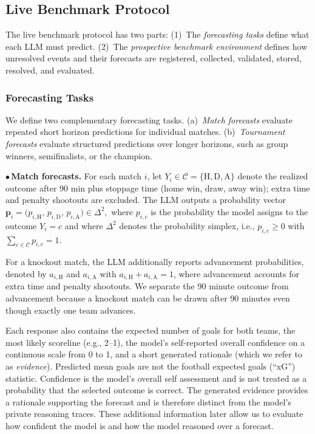 \documentclass[sigconf,nonacm]{acmart}
\begin{document}
\subsection{Live Benchmark Protocol}
\label{sec:live-protocol}
The live benchmark protocol has two parts: (1)~The \emph{forecasting tasks} define what each LLM must predict. (2)~The \emph{prospective benchmark environment} defines how unresolved events and their forecasts are registered, collected, validated, stored, resolved, and evaluated.

\subsubsection{Forecasting Tasks}
\label{sec:forecasting-tasks}

We define two complementary forecasting tasks. (a)~\emph{Match forecasts} evaluate repeated short horizon predictions for individual matches. (b)~\emph{Tournament forecasts} evaluate structured predictions over longer horizons, such as group winners, semifinalists, or the champion.

\textbf{$\bullet$\,Match forecasts.}
For each match $i$, let $Y_i \in \mathcal{C} = \{\mathrm{H},\mathrm{D},\mathrm{A}\}$ denote the realized outcome after 90 min plus stoppage time (home win, draw, away win); extra time and penalty shootouts are excluded. The LLM outputs a probability vector
$\mathbf{p}_i = \bigl(p_{i,\mathrm{H}},\, p_{i,\mathrm{D}},\, p_{i,\mathrm{A}}\bigr) \in \Delta^{2},$
where $p_{i,c}$ is the probability the model assigns to the outcome $Y_i = c$ and where $\Delta^{2}$ denotes the probability simplex, i.e., $p_{i,c} \geq 0$ with $\sum_{c \in \mathcal{C}} p_{i,c} = 1$.

For a knockout match, the LLM additionally reports advancement probabilities, denoted by $a_{i,\mathrm{H}}$ and $a_{i,\mathrm{A}}$ with $a_{i,\mathrm{H}} + a_{i,\mathrm{A}} = 1$, where advancement accounts for extra time and penalty shootouts. We separate the 90 minute outcome from advancement because a knockout match can be drawn after 90 minutes even though exactly one team advances.

Each response also contains the expected number of goals for both teams, the most likely scoreline (e.g., 2–1), the model’s self-reported overall confidence on a continuous scale from 0 to 1, and a short generated rationale (which we refer to as \emph{evidence}). Predicted mean goals are not the football expected goals (``xG'') statistic. Confidence is the model's overall self assessment and is not treated as a probability that the selected outcome is correct. The generated evidence provides a rationale supporting the forecast and is therefore distinct from the model’s private reasoning traces. These additional information later allow us to evaluate how confident the model is and how the model reasoned over a forecast. 
\end{document}
